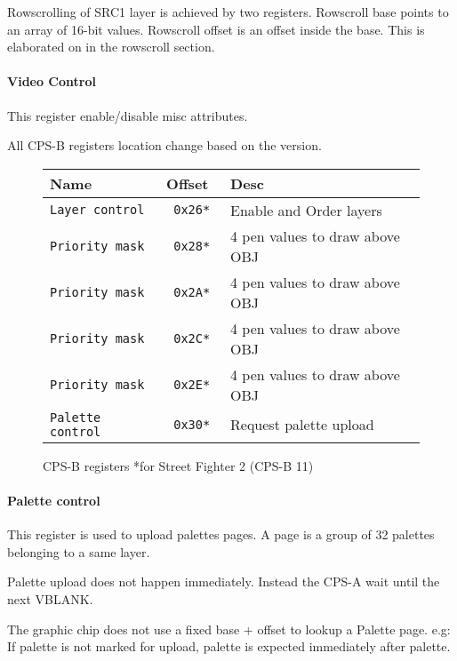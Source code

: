Rowscrolling of SRC1 layer is achieved by two registers. Rowscroll base points to an array of 16-bit values. Rowscroll offset is an offset inside the base. This is elaborated on in the rowscroll section.


\paragraph{Video Control} This register enable/disable misc attributes.

 


\pagebreak

All CPS-B registers location change based on the version.

 \begin{figure}[H]
\begin{tabularx}{\textwidth}{llX}
  \toprule    
  \textbf{Name } & \textbf{ Offset }  & \textbf{Desc }\\  
  \toprule   
  \texttt{Layer control} & \texttt{ 0x26* } & Enable and Order layers\\      
\texttt{Priority mask} & \texttt{ 0x28* } &  4 pen values to draw above OBJ   \\  
\texttt{Priority mask} & \texttt{ 0x2A* } &  4 pen values to draw above OBJ   \\  
\texttt{Priority mask} & \texttt{ 0x2C* } &  4 pen values to draw above OBJ   \\  
\texttt{Priority mask} & \texttt{ 0x2E* } &  4 pen values to draw above OBJ  \\  
\texttt{Palette control} & \texttt{ 0x30* } &  Request palette upload\\ 
  \toprule   
\end{tabularx}
\caption*{CPS-B registers *for Street Fighter 2	(CPS-B 11)}
\end{figure}

\paragraph{Palette control}This register is used to upload palettes pages. A page is a group of 32 palettes belonging to a same layer.

 

Palette upload does not happen immediately. Instead the CPS-A wait until the next VBLANK.

The graphic chip does not use a fixed base + offset to lookup a Palette page. e.g: If  palette is not marked for upload,  palette is expected immediately after  palette.



